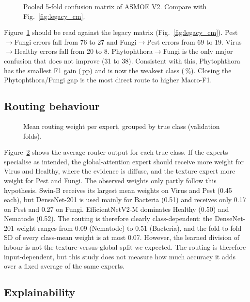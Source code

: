 \begin{figure}[h]
  \centering
  \caption{Pooled 5-fold confusion matrix of ASMOE V2. Compare with
  Fig.~\ref{fig:legacy_cm}.}
  \label{fig:v2_cm}
\end{figure}

Figure~\ref{fig:v2_cm} should be read against the legacy matrix
(Fig.~\ref{fig:legacy_cm}). Pest$\rightarrow$Fungi errors fall from 76 to 27 and
Fungi$\rightarrow$Pest errors from 69 to 19. Virus$\rightarrow$Healthy errors
fall from 20 to 8. Phytophthora$\rightarrow$Fungi is the only major confusion
that does not improve (31 to 38). Consistent with this, Phytophthora has the
smallest F1 gain (\DeltaFOnePhytopthora\,pp) and is now the weakest class
(\VtwoFOnePhytopthora\,\%). Closing the Phytophthora/Fungi gap is the most direct
route to higher Macro-F1.

\subsection{Routing behaviour}
\label{sec:results_routing}

\begin{figure}[h]
  \centering
  \caption{Mean routing weight per expert, grouped by true class (validation folds).}
  \label{fig:router}
\end{figure}

Figure~\ref{fig:router} shows the average router output for each true class. If
the experts specialise as intended, the global-attention expert should receive
more weight for Virus and Healthy, where the evidence is diffuse, and the
texture expert more weight for Pest and Fungi. The observed weights only
partly follow this hypothesis. Swin-B receives its largest mean weights on Virus
and Pest (0.45 each), but DenseNet-201 is used mainly for Bacteria (0.51) and
receives only 0.17 on Pest and 0.27 on Fungi. EfficientNetV2-M dominates Healthy
(0.50) and Nematode (0.52). The routing is therefore clearly class-dependent:
the DenseNet-201 weight ranges from 0.09 (Nematode) to 0.51 (Bacteria), and the
fold-to-fold SD of every class-mean weight is at most 0.07. However, the learned
division of labour is not the texture-versus-global split we expected. The
routing is therefore input-dependent, but this study does not measure how much
accuracy it adds over a fixed average of the same experts.

\subsection{Explainability}
\label{sec:results_xai}

